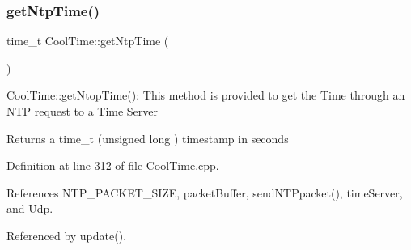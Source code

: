 \subsubsection{\texorpdfstring{get\+Ntp\+Time()}{getNtpTime()}}
{\footnotesize\ttfamily time\+\_\+t Cool\+Time\+::get\+Ntp\+Time (\begin{DoxyParamCaption}{ }\end{DoxyParamCaption})}

Cool\+Time\+::get\+Ntop\+Time()\+: This method is provided to get the Time through an N\+TP request to a Time Server

\begin{DoxyReturn}{Returns}
a time\+\_\+t (unsigned long ) timestamp in seconds 
\end{DoxyReturn}


Definition at line 312 of file Cool\+Time.\+cpp.



References N\+T\+P\+\_\+\+P\+A\+C\+K\+E\+T\+\_\+\+S\+I\+ZE, packet\+Buffer, send\+N\+T\+Ppacket(), time\+Server, and Udp.



Referenced by update().


